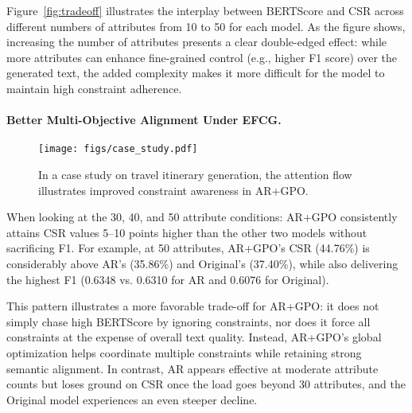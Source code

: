 Figure~\ref{fig:tradeoff} illustrates the interplay between BERTScore and CSR across different numbers of attributes from 10 to 50 for each model. As the figure shows, increasing the number of attributes presents a clear double-edged effect: while more attributes can enhance fine-grained control (e.g., higher F1 score) over the generated text, the added complexity makes it more difficult for the model to maintain high constraint adherence.

\paragraph{Better Multi-Objective Alignment Under EFCG.}
\begin{figure*}[htbp]
    \centering
        \texttt{[image: figs/case\_study.pdf]}
    \caption{In a case study on travel itinerary generation, the attention flow illustrates improved constraint awareness in AR+GPO.}
    \vspace{-1em}
    \label{fig:case_study}
\end{figure*}

When looking at the 30, 40, and 50 attribute conditions:
AR+GPO consistently attains CSR values 5--10 points higher than the other two models without sacrificing F1.
For example, at 50 attributes, AR+GPO’s CSR (44.76\%) is considerably above AR’s (35.86\%) and Original’s (37.40\%), while also delivering the highest F1 (0.6348 vs. 0.6310 for AR and 0.6076 for Original).



This pattern illustrates a more favorable trade-off for AR+GPO: it does not simply chase high BERTScore by ignoring constraints, nor does it force all constraints at the expense of overall text quality. Instead, AR+GPO’s global optimization helps coordinate multiple constraints while retaining strong semantic alignment. In contrast, AR appears effective at moderate attribute counts but loses ground on CSR once the load goes beyond 30 attributes, and the Original model experiences an even steeper decline.

